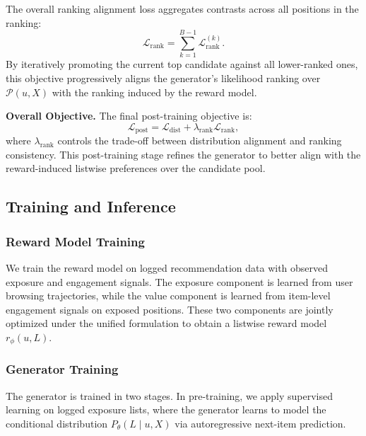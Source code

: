 \documentclass[sigconf]{acmart}
\begin{document}
The overall ranking alignment loss aggregates contrasts across all positions in the ranking:
\begin{equation}
\mathcal{L}_{\mathrm{rank}} = \sum_{k=1}^{B-1} \mathcal{L}_{\mathrm{rank}}^{(k)}.
\end{equation}
By iteratively promoting the current top candidate against all lower-ranked ones, this objective progressively aligns the generator's likelihood ranking over $\mathcal{P}(u, X)$ with the ranking induced by the reward model.

\vspace{0.5em}
\noindent\textbf{Overall Objective.}
The final post-training objective is:
\begin{equation}
\mathcal{L}_{\mathrm{post}}
=
\mathcal{L}_{\mathrm{dist}}
+
\lambda_{\mathrm{rank}} \mathcal{L}_{\mathrm{rank}},
\end{equation}
where $\lambda_{\mathrm{rank}}$ controls the trade-off between distribution alignment and ranking consistency. This post-training stage refines the generator to better align with the reward-induced listwise preferences over the candidate pool.

\subsection{Training and Inference}

\subsubsection{Reward Model Training}

We train the reward model on logged recommendation data with observed exposure and engagement signals. The exposure component is learned from user browsing trajectories, while the value component is learned from item-level engagement signals on exposed positions. These two components are jointly optimized under the unified formulation to obtain a listwise reward model $r_\phi(u, L)$.

\subsubsection{Generator Training}

The generator is trained in two stages. In pre-training, we apply supervised learning on logged exposure lists, where the generator learns to model the conditional distribution $P_\theta(L \mid u, X)$ via autoregressive next-item prediction.
\end{document}
